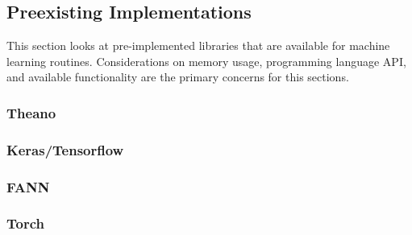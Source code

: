 \documentclass[draftclsnofoot,onecolumn,letterpaper,10pt]{IEEEtran}
\begin{document}
\subsection{Preexisting Implementations}
This section looks at pre-implemented libraries that are available for machine learning routines.
Considerations on memory usage, programming language API, and available functionality are the primary concerns for this sections.
\subsubsection{Theano}
\subsubsection{Keras/Tensorflow}
\subsubsection{FANN}
\subsubsection{Torch}
\end{document}

